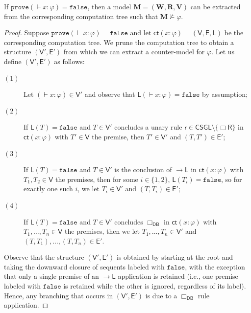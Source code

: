 \documentclass[copyright,creativecommons]{eptcs}
\newcommand{\boxr}{\Box\mathsf{R}}
\renewcommand{\phi}{\varphi}
\newcommand{\ru}{\mathsf{r}}
\newenvironment{customthm}[1]
  {\renewcommand\theinnercustomthm{#1}\innercustomthm}
  {\endinnercustomthm}
\newcommand{\calc}{\mathsf{CSGL}}
\newcommand{\sar}{\vdash}
\newcommand{\tseq}{T} %
\newcommand{\false}{\mathtt{false}}
\newcommand{\prove}{\mathtt{prove}}
\newcommand{\ndrule}{\Box_\mathsf{DB}}
\newcommand{\set}[1]{\{#1\}}
\newcommand{\ct}{\mathsf{ct}}
\newcommand{\ctv}{\mathsf{V}}
\newcommand{\cte}{\mathsf{E}}
\newcommand{\ctl}{\mathsf{L}}
\newcommand{\fval}{\false} %
\newcommand{\impl}{{\rightarrow}\mathsf{L}}
\newcommand{\M}{\mathbf{M}}
\newcommand{\W}{\mathbf{W}}
\newcommand{\R}{\mathbf{R}}
\newcommand{\V}{\mathbf{V}}
\begin{document}
\iffalse
\begin{customthm}{\ref{lem:false-gives-refute}}
If $\prove( \sar x : \phi) = \false$, then a model $\M = (\W,\R,\V)$ can be extracted from the corresponding computation tree such that $\M \not\models \phi$.
\end{customthm}

\begin{proof} Suppose $\prove(\sar x : \phi) = \false$ and let $\ct(x : \phi) = (\ctv,\cte,\ctl)$ be the corresponding computation tree. We prune the computation tree to obtain a structure $(\ctv',\cte')$ from which we can extract a counter-model for $\phi$. Let us define $(\ctv',\cte')$ as follows:
\begin{description}

\item[$(1)$] Let $( \sar x : \phi) \in \ctv'$ and observe that $\ctl( \sar x : \phi) = \fval$ by assumption;

\item[$(2)$] If $\ctl(\tseq) = \fval$ and $\tseq \in \ctv'$ concludes a unary rule $ \ru \in \calc \setminus \set{\boxr}$ in $\ct(x : \phi)$ with $\tseq' \in \ctv$ the premise, then $\tseq' \in \ctv'$ and $(\tseq,\tseq') \in \cte'$;

\item[$(3)$] If $\ctl(\tseq) = \fval$ and $\tseq \in \ctv'$ is the conclusion of $\impl$ in $\ct(x : \phi)$ with $\tseq_{1}, \tseq_{2} \in \ctv$ the premises, then for some $i \in \set{1,2}$, $\ctl(\tseq_{i}) = \fval$, so for exactly one such $i$, we let $\tseq_{i} \in \ctv'$ and $(\tseq,\tseq_{i}) \in \cte'$;

\item[$(4)$] If $\ctl(\tseq) = \fval$ and $\tseq \in \ctv'$ concludes $\ndrule$ in $\ct(x : \phi)$ with $\tseq_{1}, \ldots, \tseq_{n} \in \ctv$ the premises, then we let $\tseq_{1}, \ldots, \tseq_{n} \in \ctv'$ and $(\tseq,\tseq_{1}), \ldots, (\tseq,\tseq_{n}) \in \cte'$.

\end{description}
Observe that the structure $(\ctv',\cte')$ is obtained by starting at the root and taking the downward closure of sequents labeled with $\false$, with the exception that only a single premise of an $\impl$ application is retained (i.e., one premise labeled with $\false$ is retained while the other is ignored, regardless of its label). Hence, any branching that occurs in $(\ctv',\cte')$ is due to a $\ndrule$ rule application.


\end{proof}
\end{document}
